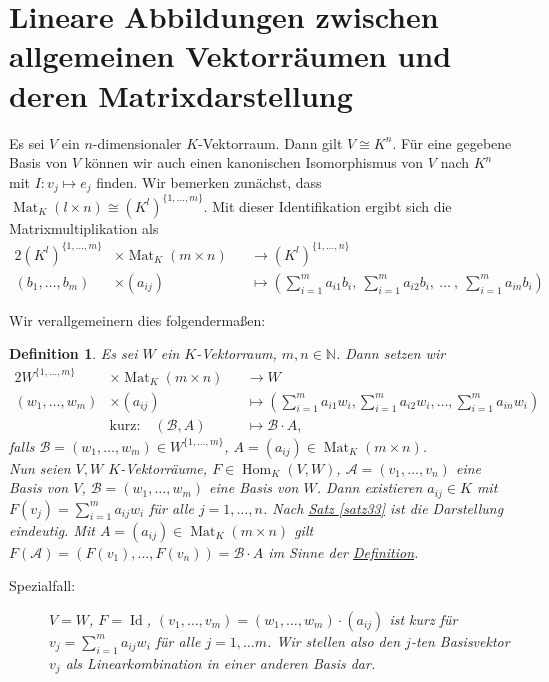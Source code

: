 \documentclass{report}
\newcommand{\N}{\mathbb{N}}
\newcommand{\baseb}{\mathcal{B}}
\newcommand{\basea}{\mathcal{A}}
\DeclareMathOperator{\Hom}{Hom}
\DeclareMathOperator{\Mat}{Mat}
\DeclareMathOperator{\Id}{Id}
\theoremstyle{customrem}
\theoremstyle{customdef}
\newtheorem{definition}{Definition}[chapter]
\theoremstyle{customenv}
\begin{document}
\section{Lineare Abbildungen zwischen allgemeinen Vektorräumen und deren Matrixdarstellung}

Es sei \(V\) ein \(n\)-dimensionaler \(K\)-Vektorraum. Dann gilt \(V\cong K^n\). Für eine gegebene Basis von \(V\) können wir auch einen kanonischen Isomorphismus von \(V\) nach \(K^n\) mit \(I:v_j\mapsto e_j\) finden. Wir bemerken zunächst, dass \(\Mat_K(l\times n)\cong \left(K^l\right)^{\{1, \ldots, m\}}\). Mit dieser Identifikation ergibt sich die Matrixmultiplikation als
\begin{alignat*}{2}
	\left(K^l\right)^{\{1, \ldots, m\}} &\times \Mat_K(m\times n) &&\to \left(K^l\right)^{\{1, \ldots, n\}}\\
							  (b_1, \ldots, b_m) &\times (a_{ij}) &&\mapsto \left(\sum_{i=1}^{m}a_{i1}b_i,\ \sum_{i=1}^{m}a_{i2}b_i,\ \ldots\ , \ \sum_{i=1}^{m}a_{in}b_i\right)
\end{alignat*}

Wir verallgemeinern dies folgendermaßen:

	\begin{definition}
		\label{def45}
		Es sei \(W\) ein \(K\)-Vektorraum, \(m,n\in\N\). Dann setzen wir
		\begin{alignat*}{2}
			W^{\{1,\ldots, m\}} &\times \Mat_K(m\times n) &&\to W\\
			(w_1,\ldots, w_m) &\times (a_{ij}) &&\mapsto \left(\sum_{i=1}^{m}a_{i1}w_i, \sum_{i=1}^{m}a_{i2}w_i, \ldots, \sum_{i=1}^{m}a_{in}w_i\right)\\
			&\text{kurz:}\quad (\baseb, A) &&\mapsto \baseb\cdot A,
		\end{alignat*}
		falls \(\baseb=(w_1,\ldots, w_m)\in W^{\{1, \ldots, m\}}\), \(A=(a_{ij})\in\Mat_K(m\times n)\).\\

		Nun seien \(V,W\) \(K\)-Vektorräume, \(F\in\Hom_K(V,W)\), \(\basea = (v_1,\ldots, v_n)\) eine Basis von \(V\), \(\baseb=(w_1, \ldots, w_m)\) eine Basis von \(W\). Dann existieren \(a_{ij} \in K\) mit \(F(v_j) = \sum_{i=1}^{m}a_{ij}w_i\) für alle \(j=1,\ldots, n\). Nach \hyperref[satz33]{Satz \ref*{satz33}} ist die Darstellung eindeutig. Mit \(A=(a_{ij})\in\Mat_K(m\times n)\) gilt \(F(\basea) = (F(v_1), \ldots, F(v_n))=\baseb\cdot A\) im Sinne der \hyperref[def45]{Definition}.
		\begin{description}
			\item[Spezialfall:] \(V=W\), \(F=\Id\), \((v_1, \ldots, v_m) =(w_1, \ldots, w_m)\cdot(a_{ij})\) ist kurz für \(v_j = \sum_{i=1}^{m}a_{ij}w_i\) für alle \(j=1,\ldots m\). Wir stellen also den \(j\)-ten Basisvektor \(v_j\) als Linearkombination in einer anderen Basis dar.
		\end{description}
	\end{definition}
\end{document}
